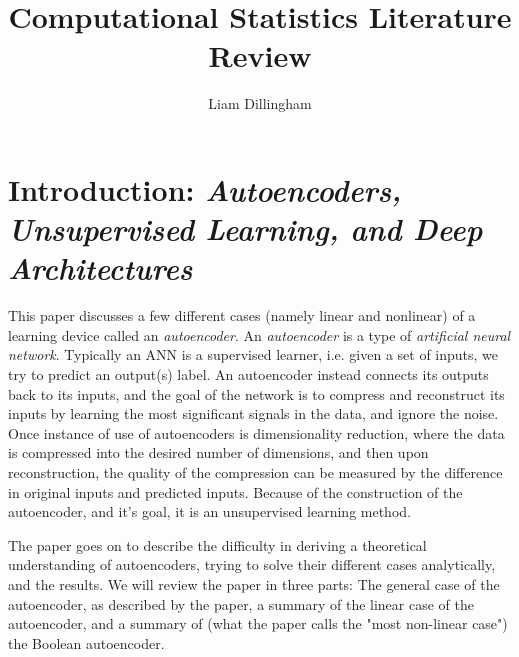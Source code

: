 \documentclass[20pt]{article} %
\title{Computational Statistics Literature Review}
\author{Liam Dillingham}
\begin{document}
\maketitle

\section{Introduction: \textit{Autoencoders, Unsupervised Learning, and Deep Architectures}}
This paper discusses a few different cases (namely linear and nonlinear) of a learning device called an \textit{autoencoder}.  An \textit{autoencoder} is a type of \textit{artificial neural network}.  Typically an ANN is a supervised learner, i.e. given a set of inputs, we try to predict an output(s) label.  An autoencoder instead connects its outputs back to its inputs, and the goal of the network is to compress and reconstruct its inputs by learning the most significant signals in the data, and ignore the noise.  Once instance of use of autoencoders is dimensionality reduction, where the data is compressed into the desired number of dimensions, and then upon reconstruction, the quality of the compression can be measured by the difference in original inputs and predicted inputs.  Because of the construction of the autoencoder, and it's goal, it is an unsupervised learning method.

The paper goes on to describe the difficulty in deriving a theoretical understanding of autoencoders, trying to solve their different cases analytically, and the results.  We will review the paper in three parts: The general case of the autoencoder, as described by the paper, a summary of the linear case of the autoencoder, and a summary of (what the paper calls the "most non-linear case") the Boolean autoencoder.
\end{document}

